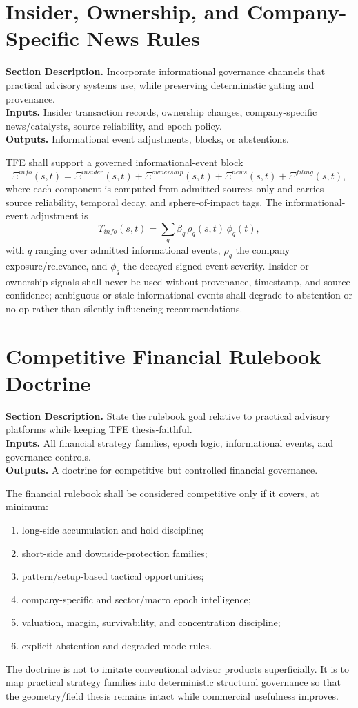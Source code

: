 \documentclass[11pt]{report}
\newcommand{\meta}[3]{\textbf{Section Description.} #1\\
\textbf{Inputs.} #2\\
\textbf{Outputs.} #3\par}
\begin{document}
\section{Insider, Ownership, and Company-Specific News Rules}
\meta{Incorporate informational governance channels that practical advisory systems use, while preserving deterministic gating and provenance.}{Insider transaction records, ownership changes, company-specific news/catalysts, source reliability, and epoch policy.}{Informational event adjustments, blocks, or abstentions.}

TFE shall support a governed informational-event block
\[
\Xi^{info}(s,t)=\Xi^{insider}(s,t)+\Xi^{ownership}(s,t)+\Xi^{news}(s,t)+\Xi^{filing}(s,t),
\]
where each component is computed from admitted sources only and carries source reliability, temporal decay, and sphere-of-impact tags. The informational-event adjustment is
\[
\Upsilon_{info}(s,t)=\sum_{q} \beta_q\,\rho_q(s,t)\,\phi_q(t),
\]
with $q$ ranging over admitted informational events, $\rho_q$ the company exposure/relevance, and $\phi_q$ the decayed signed event severity. Insider or ownership signals shall never be used without provenance, timestamp, and source confidence; ambiguous or stale informational events shall degrade to abstention or no-op rather than silently influencing recommendations.

\section{Competitive Financial Rulebook Doctrine}
\meta{State the rulebook goal relative to practical advisory platforms while keeping TFE thesis-faithful.}{All financial strategy families, epoch logic, informational events, and governance controls.}{A doctrine for competitive but controlled financial governance.}

The financial rulebook shall be considered competitive only if it covers, at minimum:
\begin{enumerate}[leftmargin=1.2cm]
    \item long-side accumulation and hold discipline;
    \item short-side and downside-protection families;
    \item pattern/setup-based tactical opportunities;
    \item company-specific and sector/macro epoch intelligence;
    \item valuation, margin, survivability, and concentration discipline;
    \item explicit abstention and degraded-mode rules.
\end{enumerate}
The doctrine is not to imitate conventional advisor products superficially. It is to map practical strategy families into deterministic structural governance so that the geometry/field thesis remains intact while commercial usefulness improves.
\end{document}
